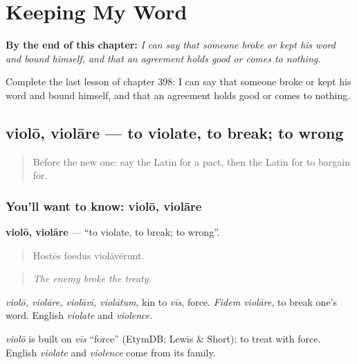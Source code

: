 
\chapter{Keeping My Word}
\label{ch:la-keeping-my-word}

\begin{chapteropening}
\textbf{By the end of this chapter:} \emph{I can say that someone broke or kept his word and bound himself, and that an agreement holds good or comes to nothing.}

Complete the last lesson of chapter 398: I can say that someone broke or kept his word and bound himself, and that an agreement holds good or comes to nothing.
\end{chapteropening}

\section[violō, violāre]{violō, violāre — to violate, to break; to wrong}

\label{lesson:LA-C398-violo}



\begin{quote}
Before the new one: say the Latin for a pact, then the Latin for to bargain for.
\end{quote}

\subsection*{You'll want to know: violō, violāre}
\textbf{violō, violāre} — \textquotedblleft{}to violate, to break; to wrong\textquotedblright{}.

\begin{quote}
Hostēs foedus violāvērunt.
\end{quote}

\begin{quote}
\emph{The enemy broke the treaty.}
\end{quote}

\emph{violō, violāre, violāvī, violātum}, kin to \emph{vīs}, force. \emph{Fidem violāre}, to break one's word. English \emph{violate} and \emph{violence}.

\begin{cousinweb}
\emph{violō} is built on \emph{vīs} \textquotedblleft{}force\textquotedblright{} (EtymDB; Lewis \& Short): to treat with force. English \emph{violate} and \emph{violence} come from its family.
\end{cousinweb}

